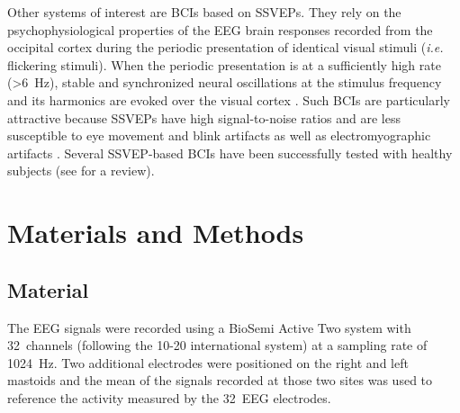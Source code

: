 \documentclass[10pt]{article}
\begin{document}

Other systems of interest are \acp{BCI} based on \acp{SSVEP}.
They rely on the psychophysiological properties of the EEG brain responses recorded from the occipital cortex during the periodic presentation of identical visual stimuli (\emph{i.e.} flickering stimuli).
When the periodic presentation is at a sufficiently high rate (\SI{>6}{\Hz}), stable and synchronized neural oscillations at the stimulus frequency and its harmonics are evoked over the visual cortex \cite{Regan1966, Herrmann2001, Luck2005}.
Such \acp{BCI} are particularly attractive because \acp{SSVEP} have high signal-to-noise ratios and are less susceptible to eye movement and blink artifacts \cite{Perlstein2003} as well as electromyographic artifacts \cite{Gray2003}.
Several \ac{SSVEP}-based \acp{BCI} have been successfully tested with healthy subjects (see \cite{Vialatte2010} for a review).








\section{Materials and Methods}
\label{sec:2MatAndMet}

    \subsection{Material}
    \label{sec:2.1Material}

    The EEG signals were recorded using a BioSemi Active Two system with 32~channels (following the 10-20 international system) at a sampling rate of \SI{1024}{\Hz}.
    Two additional electrodes were positioned on the right and left mastoids and the mean of the signals recorded at those two sites was used to reference the activity measured by the 32~EEG electrodes.
\end{document}
